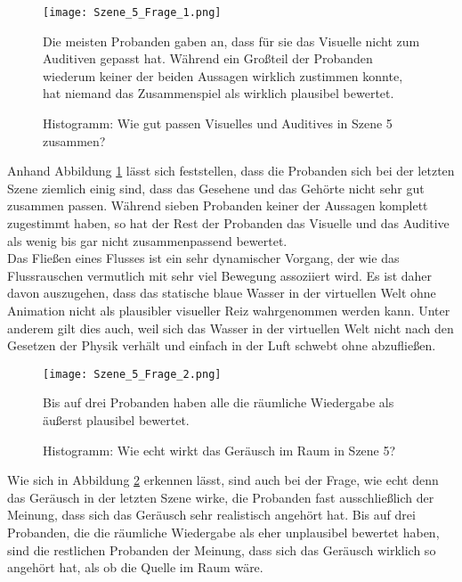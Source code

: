 \begin{figure}[H]
\centering
\texttt{[image: Szene\_5\_Frage\_1.png]}
\caption{Histogramm: Wie gut passen Visuelles und Auditives in Szene 5 zusammen?}
Die meisten Probanden gaben an, dass für sie das Visuelle nicht zum Auditiven gepasst hat. Während ein Großteil der Probanden wiederum keiner der beiden Aussagen wirklich zustimmen konnte, hat niemand das Zusammenspiel als wirklich plausibel bewertet. 
\label{fig:Szene_5_Frage1}
\end{figure} 
\vspace*{30pt}

Anhand Abbildung \ref{fig:Szene_5_Frage1} lässt sich feststellen, dass die Probanden sich bei der letzten Szene ziemlich einig sind, dass das Gesehene und das Gehörte nicht sehr gut zusammen passen. Während sieben Probanden keiner der Aussagen komplett zugestimmt haben, so hat der Rest der Probanden das Visuelle und das Auditive als wenig bis gar nicht zusammenpassend bewertet. \\

Das Fließen eines Flusses ist ein sehr dynamischer Vorgang, der wie das Flussrauschen vermutlich mit sehr viel Bewegung assoziiert wird. Es ist daher davon auszugehen, dass das statische blaue Wasser in der virtuellen Welt ohne Animation nicht als plausibler visueller Reiz wahrgenommen werden kann. Unter anderem gilt dies auch, weil sich das Wasser in der virtuellen Welt nicht nach den Gesetzen der Physik verhält und einfach in der Luft schwebt ohne abzufließen. \\

   \begin{figure}[H]
\centering
\texttt{[image: Szene\_5\_Frage\_2.png]}
\caption{Histogramm: Wie echt wirkt das Geräusch im Raum in Szene 5?}
Bis auf drei Probanden haben alle die räumliche Wiedergabe als äußerst plausibel bewertet. 
\label{fig:Szene_5_Frage2}
\end{figure} 
\vspace*{30pt}

Wie sich in Abbildung \ref{fig:Szene_5_Frage2} erkennen lässt, sind auch bei der Frage, wie echt denn das Geräusch in der letzten Szene wirke, die Probanden fast ausschließlich der Meinung, dass sich das Geräusch sehr realistisch angehört hat.  Bis auf drei Probanden, die die räumliche Wiedergabe als eher unplausibel bewertet haben, sind die restlichen Probanden der Meinung, dass sich das Geräusch wirklich so angehört hat, als ob die Quelle im Raum wäre.\\ 

